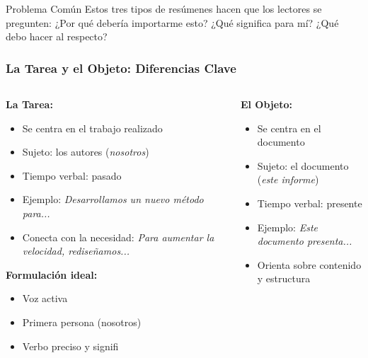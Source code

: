 \documentclass{beamer}
\begin{document}
\begin{frame}
\vspace{0.1cm}
\begin{block}{Problema Común}
Estos tres tipos de resúmenes hacen que los lectores se pregunten: ¿Por qué debería importarme esto? ¿Qué significa para mí? ¿Qué debo hacer al respecto?
\end{block}
\end{frame}

\begin{frame}
\frametitle{La Tarea y el Objeto: Diferencias Clave}

\begin{columns}[T]
\begin{column}{0.48\textwidth}
\textbf{La Tarea:}
\begin{itemize}
    \item Se centra en el trabajo realizado
    \item Sujeto: los autores (\textit{nosotros})
    \item Tiempo verbal: pasado
    \item Ejemplo: \textit{Desarrollamos un nuevo método para...}
    \item Conecta con la necesidad: \textit{Para aumentar la velocidad, rediseñamos...}
\end{itemize}

\vspace{0.1cm}
\textbf{Formulación ideal:}
\begin{itemize}
    \item Voz activa
    \item Primera persona (nosotros)
    \item Verbo preciso y signifi
\end{itemize}
\end{column}

\begin{column}{0.48\textwidth}
\textbf{El Objeto:}
\begin{itemize}
    \item Se centra en el documento
    \item Sujeto: el documento (\textit{este informe})
    \item Tiempo verbal: presente
    \item Ejemplo: \textit{Este documento presenta...}
    \item Orienta sobre contenido y estructura
\end{itemize}


\end{column}
\end{columns}
\end{frame}
\end{document}
